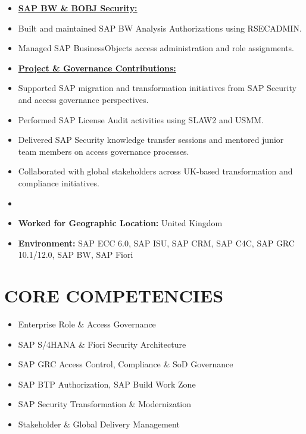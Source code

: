 \documentclass[10pt]{article}
\begin{document}
	\begin{itemize}
		\small
     		\item[] \textbf{\underline{SAP BW \& BOBJ Security:}} 
        			\item Built and maintained SAP BW Analysis Authorizations using RSECADMIN.
			\item Managed SAP BusinessObjects access administration and role assignments.
	\end{itemize}

	\begin{itemize}
		\small
     		\item[] \textbf{\underline{Project \& Governance Contributions:}} 
			\item Supported SAP migration and transformation initiatives from SAP Security and access governance perspectives.
			\item Performed SAP License Audit activities using SLAW2 and USMM.  
			\item Delivered SAP Security knowledge transfer sessions and mentored junior team members on access governance processes.
			\item Collaborated with global stakeholders across UK-based transformation and compliance initiatives.
	\end{itemize}

		\begin{itemize}

	       		 \item[]  
        			\item[\ding{226}] \textbf {Worked for Geographic Location:} United Kingdom

			\item[] \textbf {Environment: } SAP ECC 6.0, SAP ISU, SAP CRM, SAP C4C, SAP GRC 10.1/12.0, SAP BW, SAP Fiori
		\end{itemize}
	

\section{CORE COMPETENCIES}
\begin{itemize}
	\small
    \item Enterprise Role  \& Access Governance
    \item SAP S/4HANA \& Fiori Security Architecture
    \item SAP GRC Access Control, Compliance \& SoD Governance
    \item SAP BTP Authorization, SAP Build Work Zone
    \item SAP Security Transformation \& Modernization
    \item Stakeholder \& Global Delivery Management
\end{itemize}
	
\end{document}
